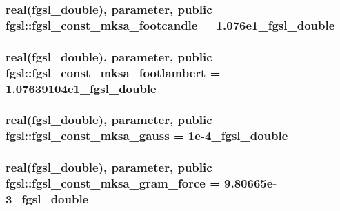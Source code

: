 \hypertarget{classfgsl_aed42c585eae8fbc1ddd6baf9d539408f}{
\subsubsection[{fgsl\-\_\-const\-\_\-mksa\-\_\-footcandle}]{\setlength{\rightskip}{0pt plus 5cm}real({\bf fgsl\-\_\-double}), parameter, public fgsl\-::fgsl\-\_\-const\-\_\-mksa\-\_\-footcandle = 1.\-076e1\-\_\-fgsl\-\_\-double}}\label{classfgsl_aed42c585eae8fbc1ddd6baf9d539408f}
\hypertarget{classfgsl_a5362c5c67d790eba885afc839e76df4a}{
\subsubsection[{fgsl\-\_\-const\-\_\-mksa\-\_\-footlambert}]{\setlength{\rightskip}{0pt plus 5cm}real({\bf fgsl\-\_\-double}), parameter, public fgsl\-::fgsl\-\_\-const\-\_\-mksa\-\_\-footlambert = 1.\-07639104e1\-\_\-fgsl\-\_\-double}}\label{classfgsl_a5362c5c67d790eba885afc839e76df4a}
\hypertarget{classfgsl_a043539089f28355888955c6546349052}{
\subsubsection[{fgsl\-\_\-const\-\_\-mksa\-\_\-gauss}]{\setlength{\rightskip}{0pt plus 5cm}real({\bf fgsl\-\_\-double}), parameter, public fgsl\-::fgsl\-\_\-const\-\_\-mksa\-\_\-gauss = 1e-\/4\-\_\-fgsl\-\_\-double}}\label{classfgsl_a043539089f28355888955c6546349052}
\hypertarget{classfgsl_ac3e7e21c6fe9874df8a9b7583e343e76}{
\subsubsection[{fgsl\-\_\-const\-\_\-mksa\-\_\-gram\-\_\-force}]{\setlength{\rightskip}{0pt plus 5cm}real({\bf fgsl\-\_\-double}), parameter, public fgsl\-::fgsl\-\_\-const\-\_\-mksa\-\_\-gram\-\_\-force = 9.\-80665e-\/3\-\_\-fgsl\-\_\-double}}\label{classfgsl_ac3e7e21c6fe9874df8a9b7583e343e76}
